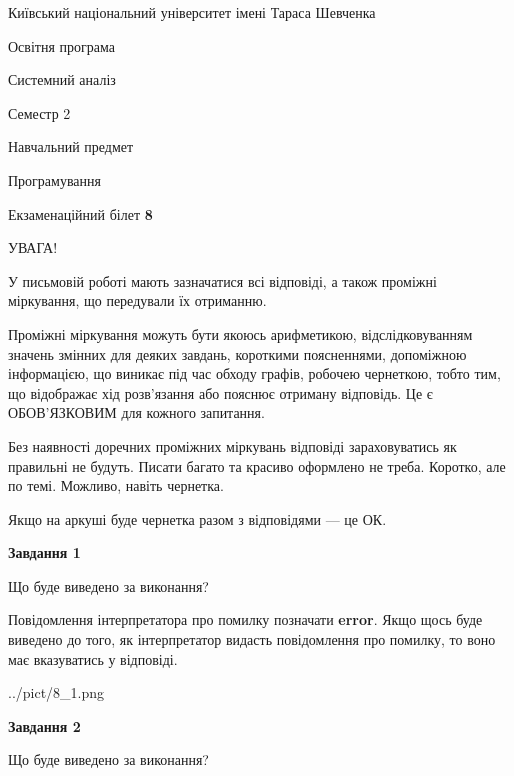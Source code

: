 \documentclass[12pt, ukrainian]{article}
\begin{document}
{{\begin {small}\par
{ \center  Київський національний університет імені Тараса Шевченка \par}
{\parbox {5 cm}{Освітня програма \hfill}{\parbox {7 cm}{Системний аналіз \hfill}}\parbox {6 cm}{\hfill Семестр 2}}\par
{\parbox {5 cm} {Навчальний предмет \hfill}\parbox {7 cm}{Програмування \hfill}\parbox {6cm}{\hfill}\par}\vspace{-7pt} \end{small}}{\center Екзаменаційний білет \No \textbf
{ 8 }\par}}
{
\begin {large}
УВАГА!

У письмовій роботі мають зазначатися всі відповіді, а також проміжні міркування, що передували їх отриманню.

Проміжні міркування можуть бути якоюсь арифметикою, відслідковуванням зна\-чень змінних для деяких завдань,
короткими поясненнями, допоміжною інформацією, що виникає під час обходу графів, робочею чернеткою,
тобто тим, що відображає хід розв’язання або пояснює отриману відповідь.
Це є ОБОВ’ЯЗКОВИМ для кожного запитання.

Без наявності доречних проміжних міркувань відповіді зараховуватись як правиль\-ні не будуть.
Писати багато та красиво оформлено не треба. Коротко, але по темі. Можли\-во, навіть чернетка.

Якщо на аркуші буде чернетка разом з відповідями --- це ОК.

\newpage

{\begin {center}\textbf{Завдання 1}\end {center}}\par
Що буде виведено за виконання?

Повідомлення інтерпретатора про помилку позначати \textbf{error}.
Якщо щось буде виведено до того, як інтерпретатор видасть повідомлення про помилку, 
то воно має вказуватись у відповіді. \par


\begin{center}
	{../pict/8_1.png}
\end{center}
\newpage

{\begin {center}\textbf{Завдання 2}\end {center}}\par
Що буде виведено за виконання?


\end{large}}
\end{document}
